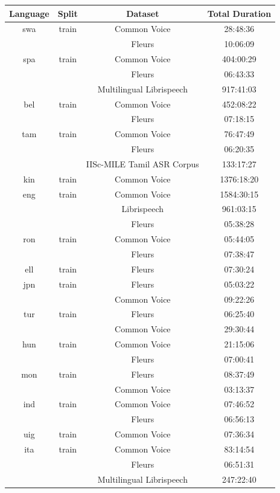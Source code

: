 \begin{longtable}{cccc}
\toprule
Language & Split & Dataset & Total Duration \\ 
\midrule
swa & train & Common Voice & 28:48:36 \\ 
 & & Fleurs & 10:06:09 \\ \midrule
spa & train & Common Voice & 404:00:29 \\ 
 & & Fleurs & 06:43:33 \\ 
 & & Multilingual Librispeech & 917:41:03 \\ \midrule
bel & train & Common Voice & 452:08:22 \\ 
 & & Fleurs & 07:18:15 \\ \midrule
tam & train & Common Voice & 76:47:49 \\ 
 & & Fleurs & 06:20:35 \\ 
 & & IISc-MILE Tamil ASR Corpus & 133:17:27 \\ \midrule
kin & train & Common Voice & 1376:18:20 \\ \midrule
eng & train & Common Voice & 1584:30:15 \\ 
 & & Librispeech & 961:03:15 \\ 
 & & Fleurs & 05:38:28 \\ \midrule
ron & train & Common Voice & 05:44:05 \\ 
 & & Fleurs & 07:38:47 \\  \midrule
ell & train & Fleurs & 07:30:24 \\  \midrule
jpn & train & Fleurs & 05:03:22 \\ 
 & & Common Voice & 09:22:26 \\  \midrule
tur & train & Fleurs & 06:25:40 \\ 
 & & Common Voice & 29:30:44 \\ \midrule
hun & train & Common Voice & 21:15:06 \\ 
 & & Fleurs & 07:00:41 \\ \midrule
mon & train & Fleurs & 08:37:49 \\ 
 & & Common Voice & 03:13:37 \\ \midrule
ind & train & Common Voice & 07:46:52 \\ 
 & & Fleurs & 06:56:13 \\ \midrule
uig & train & Common Voice & 07:36:34 \\  \midrule
ita & train & Common Voice & 83:14:54 \\ 
 & & Fleurs & 06:51:31 \\ 
 & & Multilingual Librispeech & 247:22:40 \\  \midrule

\end{longtable}

